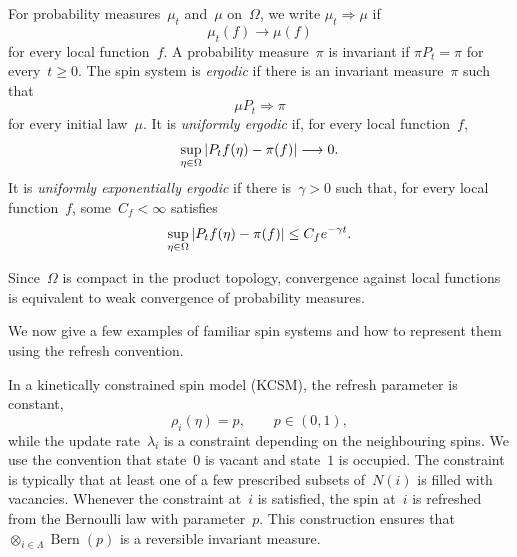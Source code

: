 \documentclass[EJP,preprint,NODS,nobera]{ejpecp}
\begin{document}
\begin{definition}
For probability measures~$\mu_t$ and~$\mu$ on~$\Omega$, we write
$\mu_t\Rightarrow\mu$ if
\begin{equation*}
\mu_t(f)\longrightarrow\mu(f)
\end{equation*}
for every local function~$f$. A probability measure~$\pi$ is invariant if
$\pi P_t=\pi$ for every~$t\geq0$. The spin system is \emph{ergodic} if there
is an invariant measure~$\pi$ such that
\begin{equation*}
\mu P_t\Rightarrow\pi
\end{equation*}
for every initial law~$\mu$. It is \emph{uniformly ergodic} if, for every local
function~$f$,
\begin{equation*}
\sup_{\eta\in\Omega}
\left|P_tf(\eta)-\pi(f)\right|
\longrightarrow0.
\end{equation*}
It is \emph{uniformly exponentially ergodic} if there is~$\gamma>0$ such that,
for every local function~$f$, some~$C_f<\infty$ satisfies
\begin{equation*}
\sup_{\eta\in\Omega}
\left|P_tf(\eta)-\pi(f)\right|
\leq C_fe^{-\gamma t}.
\end{equation*}
\end{definition}

\begin{remark}
Since~$\Omega$ is compact in the product topology, convergence against local
functions is equivalent to weak convergence of probability measures.
\end{remark}

We now give a few examples of familiar spin systems and how to represent them using the refresh convention.

\begin{example}
In a kinetically constrained spin model (KCSM), the refresh parameter is
constant,
\begin{equation*}
\rho_i(\eta)=p,
\qquad p\in(0,1),
\end{equation*}
while the update rate~$\lambda_i$ is a constraint depending on the neighbouring
spins. We use the convention that state~$0$ is vacant and state~$1$ is occupied. The constraint is typically that at least one of a few prescribed subsets of~$N(i)$ is filled with vacancies. 
Whenever the constraint at~$i$ is satisfied, the spin at~$i$ is refreshed
from the Bernoulli law with parameter~$p$. This construction ensures that~$\otimes_{i\in \Lambda}\operatorname{Bern}(p)$ is a reversible invariant measure.
\end{example}
\end{document}

